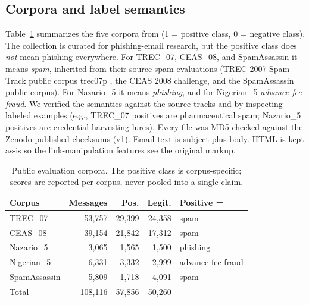 \documentclass[conference]{IEEEtran}
\begin{document}
\subsection{Corpora and label semantics}
Table~\ref{tab:corpora} summarizes the five corpora from
\cite{phishcurated,champa2024curated} (1 = positive class, 0 = negative class).
The collection is curated for phishing-email research, but the positive class
does \textit{not} mean phishing everywhere. For TREC\_07, CEAS\_08, and
SpamAssassin it means \textit{spam}, inherited from their source spam
evaluations (TREC 2007 Spam Track public corpus trec07p \cite{trec07}, the
CEAS 2008 challenge, and the SpamAssassin public corpus). For Nazario\_5 it
means \textit{phishing}, and for Nigerian\_5 \textit{advance-fee fraud}. We
verified the semantics against the source tracks and by inspecting labeled
examples (e.g., TREC\_07 positives are pharmaceutical spam; Nazario\_5
positives are credential-harvesting lures). Every file was MD5-checked
against the Zenodo-published checksums (v1). Email text is subject plus body.
HTML is kept as-is so the link-manipulation features see the original
markup.

\begin{table}[htbp]
\caption{Public evaluation corpora. The positive class is corpus-specific;
scores are reported per corpus, never pooled into a single claim.}
\label{tab:corpora}
\centering
\footnotesize
\begin{tabular}{@{}lrrrl@{}}
\toprule
Corpus & Messages & Pos. & Legit. & Positive = \\
\midrule
TREC\_07 & 53,757 & 29,399 & 24,358 & spam \\
CEAS\_08 & 39,154 & 21,842 & 17,312 & spam \\
Nazario\_5 & 3,065 & 1,565 & 1,500 & phishing \\
Nigerian\_5 & 6,331 & 3,332 & 2,999 & advance-fee fraud \\
SpamAssassin & 5,809 & 1,718 & 4,091 & spam \\
\midrule
Total & 108,116 & 57,856 & 50,260 & --- \\
\bottomrule
\end{tabular}
\end{table}
\end{document}
